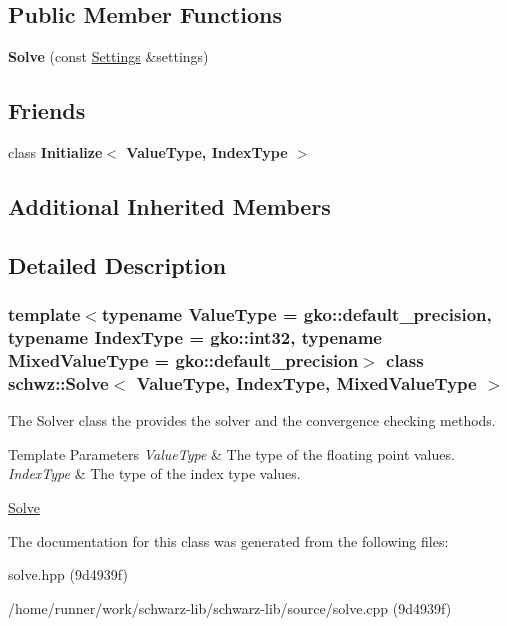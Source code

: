 \subsection*{Public Member Functions}
\begin{DoxyCompactItemize}
\item 
\mbox{\label{classschwz_1_1Solve_a667e6b9674ec54bb95152c8f263f1467}} 
{\bfseries Solve} (const \hyperlink{structschwz_1_1Settings}{Settings} \&settings)
\end{DoxyCompactItemize}
\subsection*{Friends}
\begin{DoxyCompactItemize}
\item 
\mbox{\label{classschwz_1_1Solve_a7044b349fe5363eeace2d1a56b38f650}} 
class {\bfseries Initialize$<$ Value\+Type, Index\+Type $>$}
\end{DoxyCompactItemize}
\subsection*{Additional Inherited Members}


\subsection{Detailed Description}
\subsubsection*{template$<$typename Value\+Type = gko\+::default\+\_\+precision, typename Index\+Type = gko\+::int32, typename Mixed\+Value\+Type = gko\+::default\+\_\+precision$>$\newline
class schwz\+::\+Solve$<$ Value\+Type, Index\+Type, Mixed\+Value\+Type $>$}

The Solver class the provides the solver and the convergence checking methods. 


\begin{DoxyTemplParams}{Template Parameters}
{\em Value\+Type} & The type of the floating point values. \\
\hline
{\em Index\+Type} & The type of the index type values.\\
\hline
\end{DoxyTemplParams}
\hyperlink{group__solve}{Solve} 

The documentation for this class was generated from the following files\+:\begin{DoxyCompactItemize}
\item 
solve.\+hpp (9d4939f)\item 
/home/runner/work/schwarz-\/lib/schwarz-\/lib/source/solve.\+cpp (9d4939f)\end{DoxyCompactItemize}
